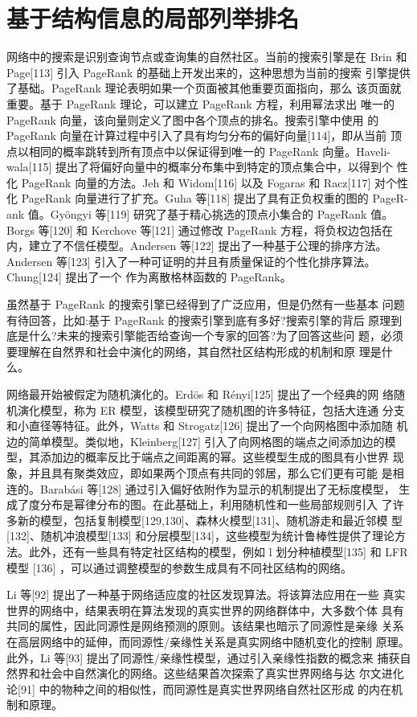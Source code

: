 \documentclass[a4paper]{apa6}
\begin{document}
\section{基于结构信息的局部列举排名}
\label{sec:org80eef03}
网络中的搜索是识别查询节点或查询集的自然社区。当前的搜索引擎是在 Brin 和 Page[113] 引入 PageRank 的基础上开发出来的，这种思想为当前的搜索 引擎提供了基础。PageRank 理论表明如果一个页面被其他重要页面指向，那么 该页面就重要。基于 PageRank 理论，可以建立 PageRank 方程，利用幂法求出 唯一的 PageRank 向量，该向量则定义了图中各个顶点的排名。搜索引擎中使用 的 PageRank 向量在计算过程中引入了具有均匀分布的偏好向量[114]，即从当前 顶点以相同的概率跳转到所有顶点中以保证得到唯一的 PageRank 向量。Haveli- wala[115] 提出了将偏好向量中的概率分布集中到特定的顶点集合中，以得到个 性化 PageRank 向量的方法。Jeh 和 Widom[116] 以及 Fogaras 和 Racz[117] 对个性 化 PageRank 向量进行了扩充。Guha 等[118] 提出了具有正负权重的图的 PageR- ank 值。Gyöngyi 等[119] 研究了基于精心挑选的顶点小集合的 PageRank 值。Borgs 等[120] 和 Kerchove 等[121] 通过修改 PageRank 方程，将负权边包括在内，建立了不信任模型。Andersen 等[122] 提出了一种基于公理的排序方法。Andersen 等[123] 引入了一种可证明的并且有质量保证的个性化排序算法。Chung[124] 提出了一个 作为离散格林函数的 PageRank。

虽然基于 PageRank 的搜索引擎已经得到了广泛应用，但是仍然有一些基本 问题有待回答，比如:基于 PageRank 的搜索引擎到底有多好?搜索引擎的背后 原理到底是什么?未来的搜索引擎能否给查询一个专家的回答?为了回答这些问 题，必须要理解在自然界和社会中演化的网络，其自然社区结构形成的机制和原 理是什么。

网络最开始被假定为随机演化的。Erdös 和 Rényi[125] 提出了一个经典的网 络随机演化模型，称为 ER 模型，该模型研究了随机图的许多特征，包括大连通 分支和小直径等特征。此外，Watts 和 Strogatz[126] 提出了一个向网格图中添加随 机边的简单模型。类似地，Kleinberg[127] 引入了向网格图的端点之间添加边的模 型，其添加边的概率反比于端点之间距离的幂。这些模型生成的图具有小世界 现象，并且具有聚类效应，即如果两个顶点有共同的邻居，那么它们更有可能 是相连的。Barabási 等[128] 通过引入偏好依附作为显示的机制提出了无标度模型， 生成了度分布是幂律分布的图。在此基础上，利用随机性和一些局部规则引入 了许多新的模型，包括复制模型[129,130]、森林火模型[131]、随机游走和最近邻模 型[132]、随机冲浪模型[133] 和分层模型[134]，这些模型为统计鲁棒性提供了理论方 法。此外，还有一些具有特定社区结构的模型，例如 l 划分种植模型[135] 和 LFR 模型 [136] ，可以通过调整模型的参数生成具有不同社区结构的网络。

Li 等[92] 提出了一种基于网络适应度的社区发现算法。将该算法应用在一些 真实世界的网络中，结果表明在算法发现的真实世界的网络群体中，大多数个体 具有共同的属性，因此同源性是网络预测的原则。该结果也暗示了同源性是亲缘 关系在高层网络中的延伸，而同源性/亲缘性关系是真实网络中随机变化的控制 原理。此外，Li 等[93] 提出了同源性/亲缘性模型，通过引入亲缘性指数的概念来 捕获自然界和社会中自然演化的网络。这些结果首次探索了真实世界网络与达 尔文进化论[91] 中的物种之间的相似性，而同源性是真实世界网络自然社区形成 的内在机制和原理。
\end{document}
